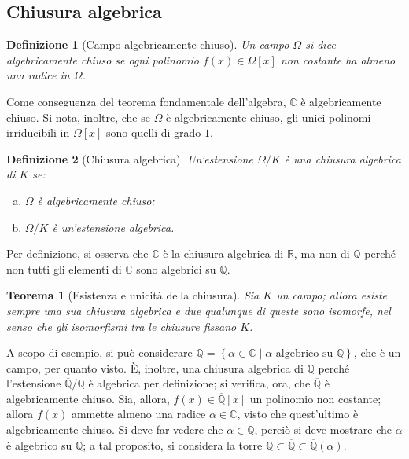 \documentclass[12pt]{scrartcl}
\theoremstyle{style}
\newtheorem{definizione}{Definizione}[section]
\newtheorem{teorema}{Teorema}[section]
\numberwithin{equation}{subsection}
\begin{document}
	\subsection{Chiusura algebrica}
	\begin{definizione}
		[Campo algebricamente chiuso]
		Un campo $\Omega $ si dice \textit{algebricamente chiuso} se ogni polinomio $f(x) \in \Omega [x]$ non costante ha almeno una radice in $\Omega $.
	\end{definizione}
	\noindent Come conseguenza del teorema fondamentale dell'algebra, $\mathbb{C}$ \`e algebricamente chiuso.
	Si nota, inoltre, che se $\Omega $ \`e algebricamente chiuso, gli unici polinomi irriducibili in $\Omega [x]$ sono quelli di grado $1$.
	\begin{definizione}
		[Chiusura algebrica]
		Un'estensione $\Omega / K$ \`e una \textit{chiusura algebrica} di $K$ se:
		\begin{enumerate}[(a).]
			\item $\Omega $ \`e algebricamente chiuso;
			\item $\Omega  / K$ \`e un'estensione algebrica.
		\end{enumerate}
	\end{definizione}
	\noindent Per definizione, si osserva che $\mathbb{C}$ \`e la chiusura algebrica di $\mathbb{R}$, ma non di $\mathbb{Q}$ perch\'e non tutti gli elementi di $\mathbb{C}$ sono algebrici su $\mathbb{Q}$.
	\begin{teorema}
		[Esistenza e unicit\`a della chiusura]
		Sia $K$ un campo; allora esiste sempre una sua chiusura algebrica e due qualunque di queste sono isomorfe, nel senso che gli isomorfismi tra le chiusure fissano $K$.
	\end{teorema}
	\noindent A scopo di esempio, si pu\`o considerare $\overline{\mathbb{Q}}=\left\{ \alpha \in \mathbb{C} \mid \alpha \text{ algebrico su } \mathbb{Q} \right\} $, che \`e un campo, per quanto visto. 
	\`E, inoltre, una chiusura algebrica di $\mathbb{Q}$ perch\'e l'estensione $\overline{\mathbb{Q}}/ \mathbb{Q}$ \`e algebrica per definizione; si verifica, ora, che $\overline{\mathbb{Q}}$ \`e algebricamente chiuso.
	Sia, allora, $f(x) \in \overline{\mathbb{Q}}[x]$ un polinomio non costante; allora $f(x)$ ammette almeno una radice $\alpha  \in \mathbb{C}$, visto che quest'ultimo \`e algebricamente chiuso.
	Si deve far vedere che $\alpha \in \overline{\mathbb{Q}}$, perci\`o si deve mostrare che $\alpha $ \`e algebrico su $\mathbb{Q}$; a tal proposito, si considera la torre $\mathbb{Q} \subset \overline{\mathbb{Q}} \subset \overline{\mathbb{Q}}(\alpha )$.
\end{document}
